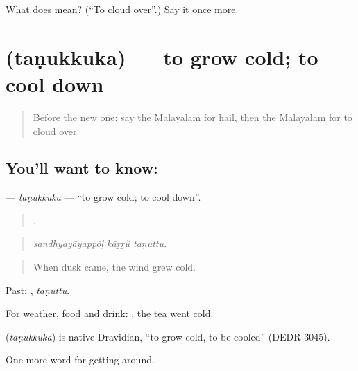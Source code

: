 \begin{tcolorbox}[breakable,colback=teal!4,colframe=teal!35!black,title={Before you move on}]
What does  mean? (\textquotedblleft{}To cloud over\textquotedblright{}.) Say it once more.
\end{tcolorbox}
\section[\texorpdfstring{\ml{തണുക്കുക} (taṇukkuka)}{തണുക്കുക (taṇukkuka)}]{ (taṇukkuka) — to grow cold; to cool down}

\label{lesson:ML-C510-tanukkuka}



\begin{quote}
Before the new one: say the Malayalam for hail, then the Malayalam for to cloud over.
\end{quote}

\subsection*{You'll want to know: }
\textbf{} — \emph{taṇukkuka} — \textquotedblleft{}to grow cold; to cool down\textquotedblright{}.

\begin{quote}
  .
\end{quote}

\begin{quote}
\emph{sandhyayāyappōḷ kāṟṟŭ taṇuttu.}
\end{quote}

\begin{quote}
When dusk came, the wind grew cold.
\end{quote}

Past: , \emph{taṇuttu}.

For weather, food and drink:  , the tea went cold.

\begin{cousinweb}
\textbf{} (\emph{taṇukkuka}) is native Dravidian, \textquotedblleft{}to grow cold, to be cooled\textquotedblright{} (DEDR 3045).
\end{cousinweb}

\begin{grammarlens}[title={What you've built}]
One more word for getting around.
\end{grammarlens}

